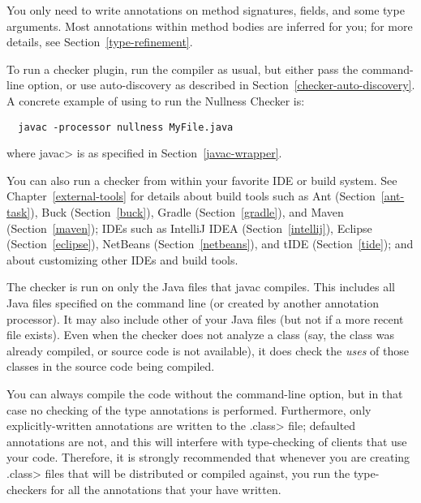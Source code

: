 You only need to write annotations on method signatures, fields, and some type arguments.
Most annotations within method bodies are inferred for you; for more details,
see  Section~\ref{type-refinement}.


To run a checker plugin, run the compiler  as usual,
but either pass the  command-line
option, or use auto-discovery as described in
Section~\ref{checker-auto-discovery}.
A concrete example of using  to run the Nullness Checker is:

\begin{Verbatim}
  javac -processor nullness MyFile.java
\end{Verbatim}

\noindent
where \<javac> is as specified in Section~\ref{javac-wrapper}.

You can also run a checker from within your favorite IDE or build system.  See
Chapter~\ref{external-tools} for details about build tools such as
Ant (Section~\ref{ant-task}),
Buck (Section~\ref{buck}),
Gradle (Section~\ref{gradle}), and
Maven (Section~\ref{maven});
IDEs such as
IntelliJ IDEA (Section~\ref{intellij}),
Eclipse (Section~\ref{eclipse}),
NetBeans (Section~\ref{netbeans}),
and
tIDE (Section~\ref{tide});
and about customizing other IDEs and build tools.

The checker is run on only the Java files that javac compiles.
This includes all Java files specified on the command line (or
created by another annotation processor).  It may also include other of
your Java files (but not if a more recent  file exists).
Even when the checker does not analyze a class (say, the class was
already compiled, or source code is not available), it does check
the \emph{uses} of those classes in the source code being compiled.

You can always compile the code without the 
command-line option, but in that case no checking of the type
annotations is performed.  Furthermore, only explicitly-written annotations
are written to the \<.class> file; defaulted annotations are not, and this
will interfere with type-checking of clients that use your code.
Therefore, it is strongly recommended that whenever you are creating
\<.class> files that will be distributed or compiled against, you run the
type-checkers for all the annotations that your have written.



